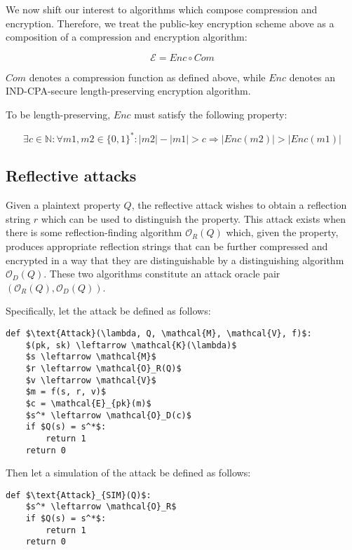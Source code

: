 \documentclass{article}
\begin{document}
We now shift our interest to algorithms which compose compression and
encryption.  Therefore, we treat the public-key encryption scheme above as a
composition of a compression and encryption algorithm:

\begin{equation*}
    \mathcal{E} = Enc \circ Com
\end{equation*}

$Com$ denotes a compression function as defined above, while $Enc$ denotes an
IND-CPA-secure length-preserving encryption algorithm.

To be length-preserving, $Enc$ must satisfy the following property:

\begin{equation*}
    \exists c \in \mathbb{N}:
    \forall m1, m2 \in \{0, 1\}^*:
    |m2| - |m1| > c
    \Rightarrow
    |Enc(m2)| > |Enc(m1)|
\end{equation*}

\subsection*{Reflective attacks}

Given a plaintext property $Q$, the reflective attack wishes to obtain a
reflection string $r$ which can be used to distinguish the property. This
attack exists when there is some reflection-finding algorithm
$\mathcal{O}_R(Q)$ which, given the property,
 produces appropriate reflection strings that can be further compressed and
 encrypted in a way that they are distinguishable by a distinguishing algorithm
 $\mathcal{O}_D(Q)$.  These two algorithms constitute an attack oracle pair
 $(\mathcal{O}_R(Q), \mathcal{O}_D(Q))$.

Specifically, let the attack be defined as follows:

\begin{lstlisting}[texcl,mathescape]
def $\text{Attack}(\lambda, Q, \mathcal{M}, \mathcal{V}, f)$:
    $(pk, sk) \leftarrow \mathcal{K}(\lambda)$
    $s \leftarrow \mathcal{M}$
    $r \leftarrow \mathcal{O}_R(Q)$
    $v \leftarrow \mathcal{V}$
    $m = f(s, r, v)$
    $c = \mathcal{E}_{pk}(m)$
    $s^* \leftarrow \mathcal{O}_D(c)$
    if $Q(s) = s^*$:
        return 1
    return 0
\end{lstlisting}

Then let a simulation of the attack be defined as follows:

\begin{lstlisting}[texcl,mathescape]
def $\text{Attack}_{SIM}(Q)$:
    $s^* \leftarrow \mathcal{O}_R$
    if $Q(s) = s^*$:
        return 1
    return 0
\end{lstlisting}
\end{document}
